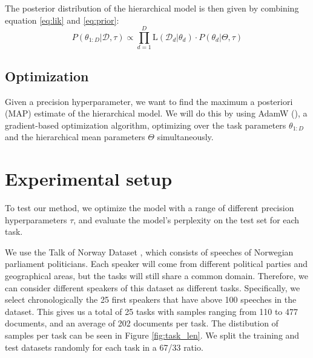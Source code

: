 \documentclass{article}
\begin{document}
The posterior distribution of the hierarchical model is then given by combining equation \ref{eq:lik} and \ref{eq:prior}:
\begin{equation} \label{eq:posterior}
    P(\theta_{1:D} | \mathcal{D}, \tau) \propto \prod_{d=1}^D \text{L}(\mathcal{D}_d | \theta_d) \cdot P(\theta_d | \Theta, \tau)
\end{equation}
%

\subsection{Optimization}
Given a precision hyperparameter, we want to find the maximum a posteriori (MAP) estimate of the hierarchical model. We will do this by using AdamW (\cite{adamW}), a gradient-based optimization algorithm, optimizing over the task parameters $\theta_{1:D}$ and the hierarchical mean parameters $\Theta$ simultaneously.

\section{Experimental setup}

To test our method, we optimize the model with a range of different precision hyperparameters $\tau$, and evaluate the model's perplexity on the test set for each task.


We use the Talk of Norway Dataset \cite{lapponi_talk_2018}, which consists of speeches of Norwegian parliament politicians. Each speaker will come from different political parties and geographical areas, but the tasks will still share a common domain. Therefore, we can consider different speakers of this dataset as different tasks. Specifically, we select chronologically the 25 first speakers that have above 100 speeches in the dataset.
This gives us a total of 25 tasks with samples ranging from 110 to 477 documents, and an average of 202 documents per task.
The distibution of samples per task can be seen in Figure \ref{fig:task_len}.
We split the training and test datasets randomly for each task in a 67/33 ratio.
\end{document}
